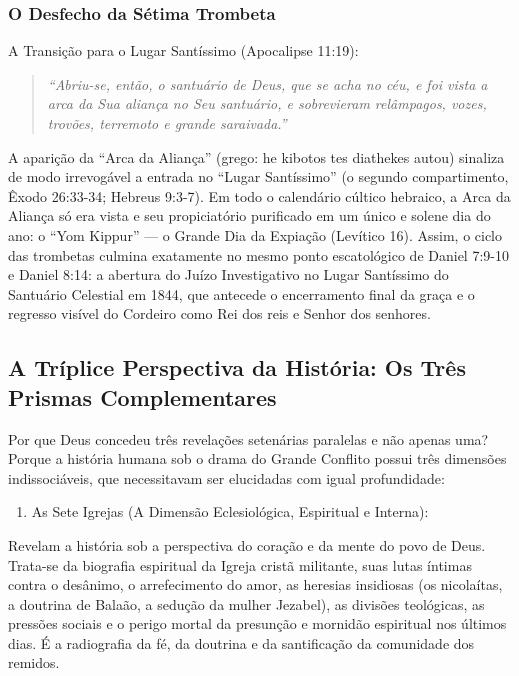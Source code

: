 \subsubsection*{O Desfecho da Sétima Trombeta}
A Transição para o Lugar Santíssimo (Apocalipse 11:19):

\begin{quote}
\itshape ``Abriu-se, então, o santuário de Deus, que se acha no céu, e foi vista a arca da Sua aliança no Seu santuário, e sobrevieram relâmpagos, vozes, trovões, terremoto e grande saraivada.''
\end{quote}

A aparição da ``Arca da Aliança'' (grego: he kibotos tes diathekes autou) sinaliza de modo irrevogável a entrada no ``Lugar Santíssimo'' (o segundo compartimento, Êxodo 26:33-34; Hebreus 9:3-7). Em todo o calendário cúltico hebraico, a Arca da Aliança só era vista e seu propiciatório purificado em um único e solene dia do ano: o ``Yom Kippur'' — o Grande Dia da Expiação (Levítico 16). Assim, o ciclo das trombetas culmina exatamente no mesmo ponto escatológico de Daniel 7:9-10 e Daniel 8:14: a abertura do Juízo Investigativo no Lugar Santíssimo do Santuário Celestial em 1844, que antecede o encerramento final da graça e o regresso visível do Cordeiro como Rei dos reis e Senhor dos senhores.



\subsection{A Tríplice Perspectiva da História: Os Três Prismas Complementares}


Por que Deus concedeu três revelações setenárias paralelas e não apenas uma? Porque a história humana sob o drama do Grande Conflito possui três dimensões indissociáveis, que necessitavam ser elucidadas com igual profundidade:

\begin{enumerate}
  \item As Sete Igrejas (A Dimensão Eclesiológica, Espiritual e Interna):
\end{enumerate}

Revelam a história sob a perspectiva do coração e da mente do povo de Deus. Trata-se da biografia espiritual da Igreja cristã militante, suas lutas íntimas contra o desânimo, o arrefecimento do amor, as heresias insidiosas (os nicolaítas, a doutrina de Balaão, a sedução da mulher Jezabel), as divisões teológicas, as pressões sociais e o perigo mortal da presunção e mornidão espiritual nos últimos dias. É a radiografia da fé, da doutrina e da santificação da comunidade dos remidos.

